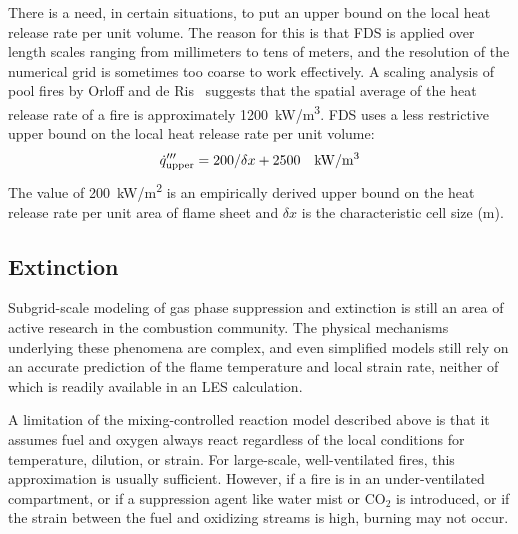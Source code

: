There is a need, in certain situations, to put an upper bound on the local heat release rate per unit volume. The reason for
this is that FDS is applied over length scales ranging from millimeters to tens of meters, and the resolution of the numerical grid
is sometimes too coarse to work effectively.
A scaling analysis of pool fires by Orloff and de Ris~\cite{Orloff:19th_Symposium} suggests that the spatial average of the
heat release rate of a fire is approximately \SI{1200}{kW/m^3}. FDS uses a less restrictive upper bound on the local heat release rate per unit volume:
\begin{equation}\label{eq:q_bound}
\dq_{\rm upper}''' = 200/\dx + 2500 \quad \si{kW/m^3}
\end{equation}
The value of \SI{200}{kW/m^2} is an empirically derived upper bound on the heat release rate per unit area of flame sheet and $\delta x$ is the characteristic cell size (m). 

%
%


\subsection{Extinction}

\label{extinction}

Subgrid-scale modeling of gas phase suppression and extinction is still an area of active research in the combustion community. The physical mechanisms underlying these phenomena are complex, and even simplified models still rely on an accurate prediction of the flame temperature and local strain rate, neither of which is readily available in an LES calculation.

A limitation of the mixing-controlled reaction model described above is that it assumes fuel and oxygen always react regardless of the local conditions for temperature, dilution, or strain. For large-scale, well-ventilated fires, this approximation is usually sufficient. However, if a fire is in an under-ventilated compartment, or if a suppression agent like water mist or CO$_2$ is introduced, or if the strain between the fuel and oxidizing streams is high, burning may not occur. 

